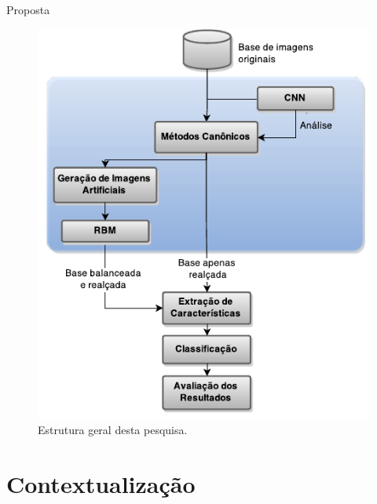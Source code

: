 \documentclass{beamer}
\begin{document}
\begin{frame}{Proposta}
\begin{figure}
    \includegraphics[height=0.75\textheight]{figuras/geral.pdf}
    \caption{Estrutura geral desta pesquisa.}
\end{figure}
\end{frame}
\section{Contextualização}
\end{document}
